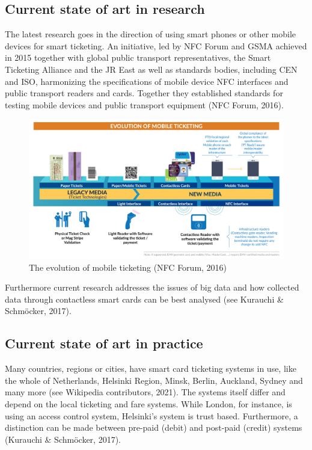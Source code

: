 \documentclass[
]{book}
\begin{document}
\hypertarget{current-state-of-art-in-research-7}{%
\subsection*{Current state of art in research}\label{current-state-of-art-in-research-7}}

The latest research goes in the direction of using smart phones or other mobile devices for smart ticketing. An initiative, led by NFC Forum and GSMA achieved in 2015 together with global public transport representatives, the Smart Ticketing Alliance and the JR East as well as standards bodies, including CEN and ISO, harmonizing the specifications of mobile device NFC interfaces and public transport readers and cards. Together they established standards for testing mobile devices and public transport equipment (NFC Forum, 2016).

\begin{figure}
\includegraphics[width=0.9\linewidth]{image/smart_cards} \caption{The evolution of mobile ticketing (NFC Forum, 2016)}\label{fig:unnamed-chunk-6}
\end{figure}

Furthermore current research addresses the issues of big data and how collected data through contactless smart cards can be best analysed (see Kurauchi \& Schmöcker, 2017).

\hypertarget{current-state-of-art-in-practice-6}{%
\subsection*{Current state of art in practice}\label{current-state-of-art-in-practice-6}}

Many countries, regions or cities, have smart card ticketing systems in use, like the whole of Netherlands, Helsinki Region, Minsk, Berlin, Auckland, Sydney and many more (see Wikipedia contributors, 2021). The systems itself differ and depend on the local ticketing and fare systems. While London, for instance, is using an access control system, Helsinki's system is trust based. Furthermore, a distinction can be made between pre-paid (debit) and post-paid (credit) systems (Kurauchi \& Schmöcker, 2017).
\end{document}
